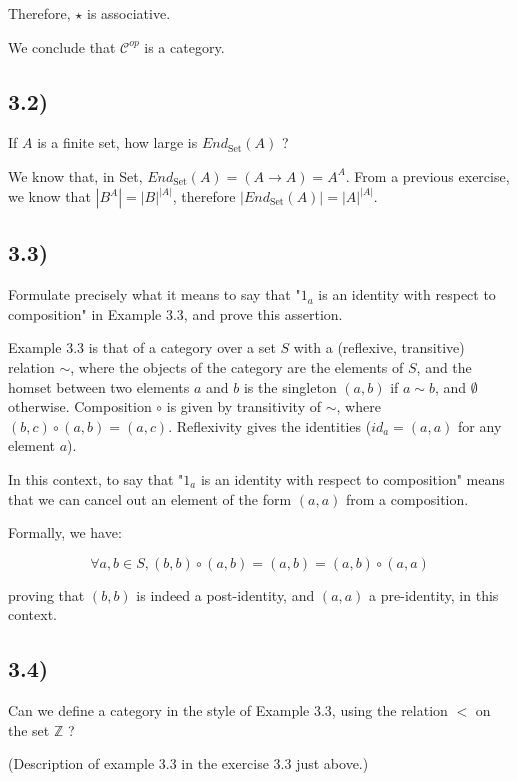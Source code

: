 \documentclass[12pt, letterpaper, twoside]{report}
\begin{document}
Therefore, $\star$ is associative.

We conclude that $\mathcal{C}^{op}$ is a category.



\subsection*{3.2)}

If $A$ is a finite set, how large is $End_{\text{Set}}(A)$ ?

We know that, in Set, $End_{\text{Set}}(A) = (A \to A) = A^A$. From a previous exercise, we know that $|B^A| = |B|^|A|$, therefore $|End_{\text{Set}}(A)| = |A|^|A|$.



\subsection*{3.3)}

Formulate precisely what it means to say that "$1_a$ is an identity with respect to composition" in Example 3.3, and prove this assertion.

Example 3.3 is that of a category over a set $S$ with a (reflexive, transitive) relation $\sim$, where the objects of the category are the elements of $S$, and the homset between two elements $a$ and $b$ is the singleton $(a,b)$ if $a \sim b$, and $\emptyset$ otherwise. Composition $\circ$ is given by transitivity of $\sim$, where $(b,c) \circ (a,b) = (a,c)$. Reflexivity gives the identities ($id_a = (a,a)$ for any element $a$).

In this context, to say that "$1_a$ is an identity with respect to composition" means that we can cancel out an element of the form $(a,a)$ from a composition.

Formally, we have:

$$\forall a,b \in S, (b,b) \circ (a,b) = (a,b) = (a,b) \circ (a,a)$$

proving that $(b,b)$ is indeed a post-identity, and $(a,a)$ a pre-identity, in this context.



\subsection*{3.4)}

Can we define a category in the style of Example 3.3, using the relation $<$ on the set $\mathbb{Z}$ ?

(Description of example 3.3 in the exercise 3.3 just above.)
\end{document}
